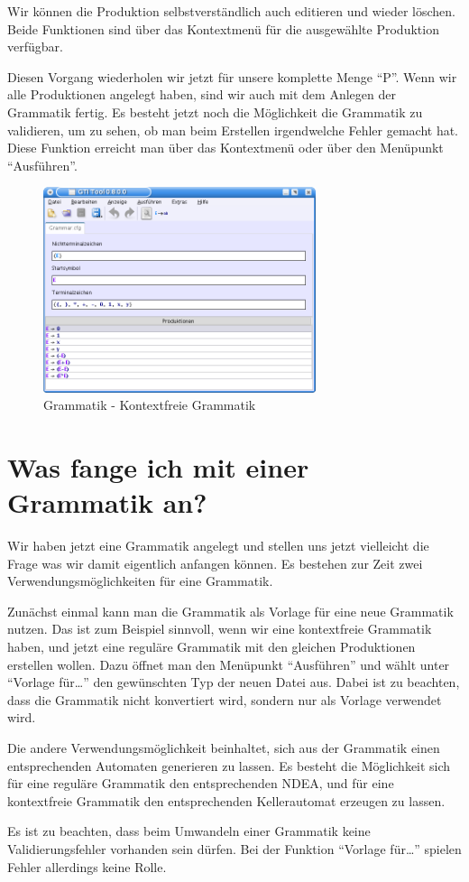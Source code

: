 Wir können die Produktion selbstverständlich auch editieren und wieder löschen.
Beide Funktionen sind über das Kontextmenü für die ausgewählte Produktion
verfügbar.\vspace{10pt}

Diesen Vorgang wiederholen wir jetzt für unsere komplette Menge "`P"'. Wenn wir
alle Produktionen angelegt haben, sind wir auch mit dem Anlegen der Grammatik
fertig. Es besteht jetzt noch die Möglichkeit die Grammatik zu validieren, um
zu sehen, ob man beim Erstellen irgendwelche Fehler gemacht hat. Diese Funktion
erreicht man über das Kontextmenü oder über den Menüpunkt "`Ausführen"'.

\begin{figure}[h]
\begin{center}
\includegraphics[width=8cm]{../images/cfg_example.png}
\caption{Grammatik - Kontextfreie Grammatik}
\end{center}
\end{figure}

\section{Was fange ich mit einer Grammatik an?}

Wir haben jetzt eine Grammatik angelegt und stellen uns jetzt vielleicht die
Frage was wir damit eigentlich anfangen können. Es bestehen zur Zeit zwei
Verwendungsmöglichkeiten für eine Grammatik.\vspace{10pt}

Zunächst einmal kann man die Grammatik als Vorlage für eine neue Grammatik
nutzen. Das ist zum Beispiel sinnvoll, wenn wir eine kontextfreie Grammatik
haben, und jetzt eine reguläre Grammatik mit den gleichen Produktionen
erstellen wollen. Dazu öffnet man den Menüpunkt "`Ausführen"' und wählt unter
"`Vorlage für\ldots"' den gewünschten Typ der neuen Datei aus.
Dabei ist zu beachten, dass die Grammatik nicht konvertiert wird,
sondern nur als Vorlage verwendet wird.\vspace{10pt}

Die andere Verwendungsmöglichkeit beinhaltet, sich aus der Grammatik einen
ent\-sprechen\-den Automaten generieren zu lassen. Es besteht die Möglichkeit
sich für eine reguläre Grammatik den entsprechenden NDEA, und für eine
kontextfreie Grammatik den entsprechenden Kellerautomat erzeugen zu
lassen.\vspace{10pt}

Es ist zu beachten, dass beim Umwandeln einer Grammatik keine
Validierungsfehler vorhanden sein dürfen. Bei der Funktion "`Vorlage
für\ldots"' spielen Fehler allerdings keine Rolle.
